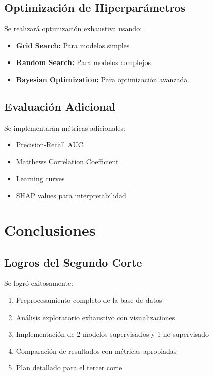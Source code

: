 \documentclass[12pt,letterpaper]{article}
\begin{document}
\subsection{Optimización de Hiperparámetros}

Se realizará optimización exhaustiva usando:
\begin{itemize}
    \item \textbf{Grid Search:} Para modelos simples
    \item \textbf{Random Search:} Para modelos complejos
    \item \textbf{Bayesian Optimization:} Para optimización avanzada
\end{itemize}

\subsection{Evaluación Adicional}

Se implementarán métricas adicionales:
\begin{itemize}
    \item Precision-Recall AUC
    \item Matthews Correlation Coefficient
    \item Learning curves
    \item SHAP values para interpretabilidad
\end{itemize}

\section{Conclusiones}

\subsection{Logros del Segundo Corte}

Se logró exitosamente:
\begin{enumerate}
    \item Preprocesamiento completo de la base de datos
    \item Análisis exploratorio exhaustivo con visualizaciones
    \item Implementación de 2 modelos supervisados y 1 no supervisado
    \item Comparación de resultados con métricas apropiadas
    \item Plan detallado para el tercer corte
\end{enumerate}
\end{document}
